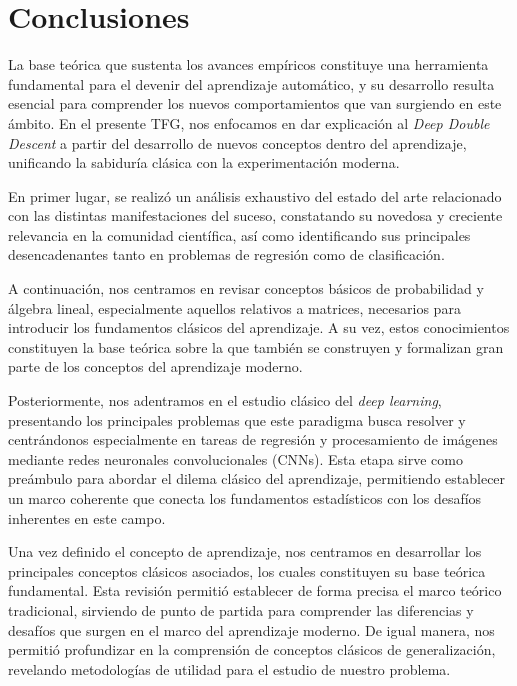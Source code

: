 
\chapter{Conclusiones}\label{ch:conclusiones}

La base teórica que sustenta los avances empíricos constituye una herramienta fundamental para el devenir del aprendizaje automático, y su desarrollo resulta esencial para comprender los nuevos comportamientos que van surgiendo en este ámbito. En el presente TFG, nos enfocamos en dar explicación al \textit{Deep Double Descent} a partir del desarrollo de nuevos conceptos dentro del aprendizaje, unificando la sabiduría clásica con la experimentación moderna.

En primer lugar, se realizó un análisis exhaustivo del estado del arte relacionado con las distintas manifestaciones del suceso, constatando su novedosa y creciente relevancia en la comunidad científica, así como identificando sus principales desencadenantes tanto en problemas de regresión como de clasificación.

A continuación, nos centramos en revisar conceptos básicos de probabilidad y álgebra lineal, especialmente aquellos relativos a matrices, necesarios para introducir los fundamentos clásicos del aprendizaje. A su vez, estos conocimientos constituyen la base teórica sobre la que también se construyen y formalizan gran parte de los conceptos del aprendizaje moderno.

Posteriormente, nos adentramos en el estudio clásico del \textit{deep learning}, presentando los principales problemas que este paradigma busca resolver y centrándonos especialmente en tareas de regresión y procesamiento de imágenes mediante redes neuronales convolucionales (CNNs). Esta etapa sirve como preámbulo para abordar el dilema clásico del aprendizaje, permitiendo establecer un marco coherente que conecta los fundamentos estadísticos con los desafíos inherentes en este campo.

Una vez definido el concepto de aprendizaje, nos centramos en desarrollar los principales conceptos clásicos asociados, los cuales constituyen su base teórica fundamental. Esta revisión permitió establecer de forma precisa el marco teórico tradicional, sirviendo de punto de partida para comprender las diferencias y desafíos que surgen en el marco del aprendizaje moderno. De igual manera, nos permitió profundizar en la comprensión de conceptos clásicos de generalización, revelando metodologías de utilidad para el estudio de nuestro problema.

